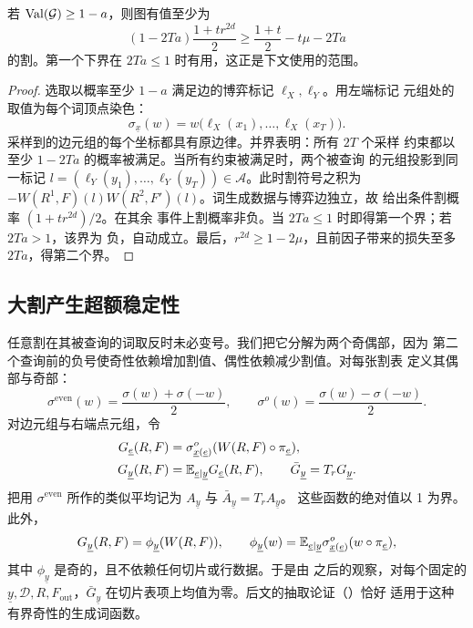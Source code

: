 \begin{lemma}[完备性]\label{lem:completeness}
若 $\operatorname{Val}(\mathcal G)\ge1-a$，则图有值至少为
\begin{equation}\label{eq:completeness}
 (1-2Ta)\frac{1+t r^{2d}}2
 \ge\frac{1+t}{2}-t\mu-2Ta
\end{equation}
的割。第一个下界在 $2Ta\le1$ 时有用，这正是下文使用的范围。
\end{lemma}

\begin{proof}
选取以概率至少 $1-a$ 满足边的博弈标记 $\ell_X,\ell_Y$。用左端标记
元组处的取值为每个词顶点染色：
\[
 \sigma_{\underline x}(w)=
 w\bigl(\ell_X(x_1),\ldots,\ell_X(x_T)\bigr).
\]
采样到的边元组的每个坐标都具有原边律。并界表明：所有 $2T$ 个采样
约束都以至少 $1-2Ta$ 的概率被满足。当所有约束被满足时，两个被查询
的元组投影到同一标记
$l=(\ell_Y(y_1),\ldots,\ell_Y(y_T))\in\mathcal A$。此时割符号之积为
$-W(R^1,F)(l)W(R^2,F')(l)$。词生成数据与博弈边独立，故
 给出条件割概率 $(1+t r^{2d})/2$。在其余
事件上割概率非负。当 $2Ta\le1$ 时即得第一个界；若 $2Ta>1$，该界为
负，自动成立。最后，$r^{2d}\ge1-2\mu$，且前因子带来的损失至多
$2Ta$，得第二个界。
\end{proof}

\subsection{大割产生超额稳定性}

任意割在其被查询的词取反时未必变号。我们把它分解为两个奇偶部，因为
第二个查询前的负号使奇性依赖增加割值、偶性依赖减少割值。对每张割表
定义其偶部与奇部：
\[
 \sigma^{\mathrm{even}}(w)=\frac{\sigma(w)+\sigma(-w)}2,
 \qquad
 \sigma^o(w)=\frac{\sigma(w)-\sigma(-w)}2.
\]
对边元组与右端点元组，令
\begin{align}
 G_{\underline e}(R,F)
 &=\sigma^o_{\underline x(\underline e)}
       (W(R,F)\circ\pi_{\underline e}),\label{eq:edge-function}\\
 G_{\underline y}(R,F)
 &=\mathbb E_{\underline e\mid\underline y}G_{\underline e}(R,F),
 \qquad \bar G_{\underline y}=T_rG_{\underline y}.
 \label{eq:average-function}
\end{align}
把用 $\sigma^{\mathrm{even}}$ 所作的类似平均记为
$A_{\underline y}$ 与 $\bar A_{\underline y}=T_rA_{\underline y}$。
这些函数的绝对值以 1 为界。此外，
\[
 G_{\underline y}(R,F)=\phi_{\underline y}(W(R,F)),\qquad
 \phi_{\underline y}(w)=\mathbb E_{\underline e\mid\underline y}
 \sigma^o_{\underline x(\underline e)}(w\circ\pi_{\underline e}),
\]
其中 $\phi_{\underline y}$ 是奇的，且不依赖任何切片或行数据。于是由
 之后的观察，对每个固定的
$\underline y,\mathcal D,R,F_{\mathrm{out}}$，$\bar G_{\underline y}$
在切片表项上均值为零。后文的抽取论证（）恰好
适用于这种有界奇性的生成词函数。

